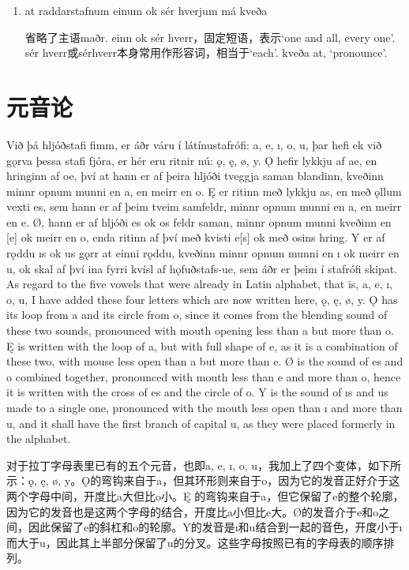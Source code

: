 \begin{grammar*}{}
    \begin{enumerate}[leftmargin=*]
        \item at raddarstafnum einum ok sér hverjum má kveða

              省略了主语maðr. einn ok sér hverr，固定短语，表示`one and all, every one'. sér hverr或sérhverr本身常用作形容词，相当于`each'. kveða at, `pronounce'.
    \end{enumerate}
\end{grammar*}
\section{元音论}
\begin{paracol}{2}
    Við þá hljóðstafi fimm, er áðr váru í látínustafrófi: a, e, ı, o, u, þar hefi ek við gǫrva þessa stafi fjóra, er hér eru ritnir nú: ǫ, ę, ø, y. Ǫ hefir lykkju af ae, en hringinn af oe, því at hann er af þeira hljóði tveggja saman blandinn, kveðinn minnr opnum munni en a, en meirr en o. Ę er ritinn með lykkju as, en með ǫllum vexti es, sem hann er af þeim tveim samfeldr, minnr opnum munni en a, en meirr en e. Ø, hann er af hljóði es ok os feldr saman, minnr opnum munni kveðinn en [e] ok meirr en o, enda ritinn af því með kvisti e[s] ok með osins hring. Y er af rǫddu ıs ok us gǫrr at einni rǫddu, kveðinn minnr opnum munni en ı ok meirr en u, ok skal af því ina fyrri kvísl af hǫfuðstafs-ue, sem áðr er þeim í stafrófi skipat.
    \switchcolumn
    As regard to the five vowels that were already in Latin alphabet, that is, a, e, ı, o, u, I have added these four letters which are now written here, ǫ, ę, ø, y. Ǫ has its loop from a and its circle from o, since it comes from the blending sound of these two sounds, pronounced with mouth opening less than a but more than o. Ę is written with the loop of a, but with full shape of e, as it is a combination of these two, with mouse less open than a but more than e. Ø is the sound of es and o combined together, pronounced with mouth less than e and more than o, hence it is written with the cross of es and the circle of o. Y is the sound of ıs and us made to a single one, pronounced with the mouth less open than ı and more than u, and it shall have the first branch of capital u, as they were placed formerly in the alphabet.
\end{paracol}
\begin{translation*}{}
    对于拉丁字母表里已有的五个元音，也即a, e, ı, o, u，我加上了四个变体，如下所示：ǫ, ę, ø, y。Ǫ的弯钩来自于a，但其环形则来自于o，因为它的发音正好介于这两个字母中间，开度比a大但比o小。Ę 的弯钩来自于a，但它保留了e的整个轮廓，因为它的发音也是这两个字母的结合，开度比a小但比e大。Ø的发音介于e和o之间，因此保留了e的斜杠和o的轮廓。Y的发音是ı和u结合到一起的音色，开度小于ı而大于u，因此其上半部分保留了u的分叉。这些字母按照已有的字母表的顺序排列。
\end{translation*}
